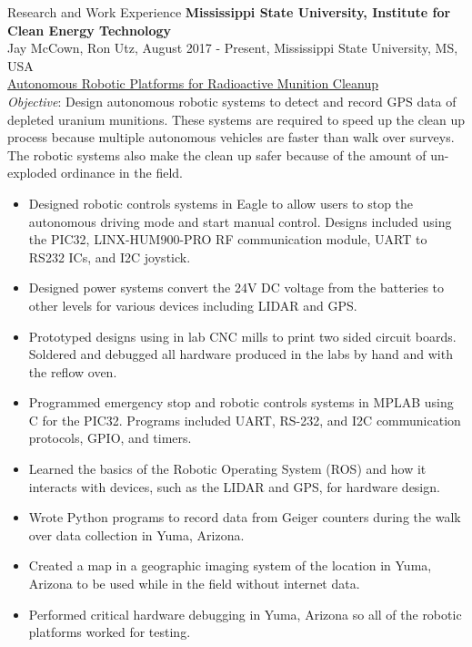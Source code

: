 \documentclass{resume} %
\begin{document}
\begin{rSection}{Research and Work Experience}
{\bf Mississippi State University, Institute for Clean Energy Technology}
\\Jay McCown, Ron Utz, August 2017 - Present, Mississippi State University, MS, USA
\\{\underline{Autonomous Robotic Platforms for Radioactive Munition Cleanup}}
\smallskip
\\{\em Objective}: Design autonomous robotic systems to detect and record GPS data of depleted uranium munitions. These systems are required to speed up the clean up process because multiple autonomous vehicles are faster than walk over surveys. The robotic systems also make the clean up safer because of the amount of un-exploded ordinance in the field. 
\begin{itemize}
    \item Designed robotic controls systems in Eagle to allow users to stop the autonomous driving mode and start manual control. Designs included using the PIC32, LINX-HUM900-PRO RF communication module, UART to RS232 ICs, and I2C joystick. 
    \item Designed power systems convert the 24V DC voltage from the batteries to other levels for various devices including LIDAR and GPS.
    \item Prototyped designs using in lab CNC mills to print two sided circuit boards. Soldered and debugged all hardware produced in the labs by hand and with the reflow oven.
    \item Programmed emergency stop and robotic controls systems in MPLAB using C for the PIC32. Programs included UART, RS-232, and I2C communication protocols, GPIO, and timers. 
    \item Learned the basics of the Robotic Operating System (ROS) and how it interacts with devices, such as the LIDAR and GPS, for hardware design. 
    \item Wrote Python programs to record data from Geiger counters during the walk over data collection in Yuma, Arizona. 
    \item Created a map in a geographic imaging system of the location in Yuma, Arizona to be used while in the field without internet data. 
    \item Performed critical hardware debugging in Yuma, Arizona so all of the robotic platforms worked for testing. 

\end{itemize}
\end{rSection}
\end{document}
